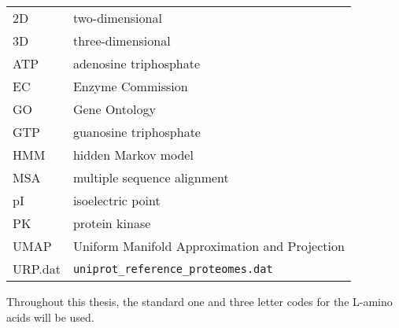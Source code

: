 
\begin{longtable}[l]{ l l }
  2D & two-dimensional \\
  3D & three-dimensional \\
  ATP & adenosine triphosphate \\
  EC & Enzyme Commission \\
  GO & Gene Ontology \\
  GTP & guanosine triphosphate \\
  HMM & hidden Markov model \\
  MSA & multiple sequence alignment \\
  pI & isoelectric point \\
  PK & protein kinase \\
  UMAP & Uniform Manifold Approximation and Projection \\
  URP.dat & \texttt{uniprot\_reference\_proteomes.dat} \\
\end{longtable}

Throughout this thesis, the standard one and three letter codes for the L-amino acids will
be used.
